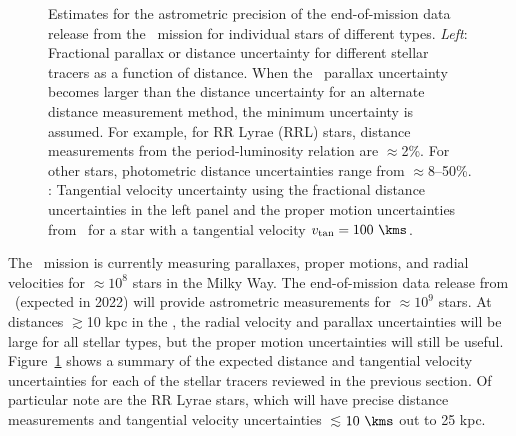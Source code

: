 \begin{figure}[h]
\centering
\caption{Estimates for the astrometric precision of the end-of-mission data release from the \gaia\ mission for individual stars of different types. \textit{Left}: Fractional parallax or distance uncertainty for different stellar tracers as a function of distance. When the \gaia\ parallax uncertainty becomes larger than the distance uncertainty for an alternate distance measurement method, the minimum uncertainty is assumed. For example, for RR Lyrae (RRL) stars, distance measurements from the period-luminosity relation are $\approx$2\%. For other stars, photometric distance uncertainties range from $\approx$8--50\%. : Tangential velocity uncertainty using the fractional distance uncertainties in the left panel and the proper motion uncertainties from \gaia\ for a star with a tangential velocity $v_{\rm tan} = 100~\kms$.}
\label{fig:gaiastellarpops}
\end{figure}

The \gaia\ mission is currently measuring parallaxes, proper motions, and radial
velocities for $\approx$$10^{8}$ stars in the Milky Way. The end-of-mission data
release from \gaia\ (expected in 2022) will provide astrometric measurements for
$\approx$$10^{9}$ stars. At distances $\gtrsim$10 kpc in the \mwhalo, the radial
velocity and parallax uncertainties will be large for all stellar types, but the
proper motion uncertainties will still be useful.
Figure~\ref{fig:gaiastellarpops} shows a summary of the expected distance and
tangential velocity uncertainties for each of the stellar tracers reviewed in
the previous section. Of particular note are the RR Lyrae stars, which will have
precise distance measurements and tangential velocity uncertainties
$\lesssim$$10~\kms$ out to 25 kpc.


